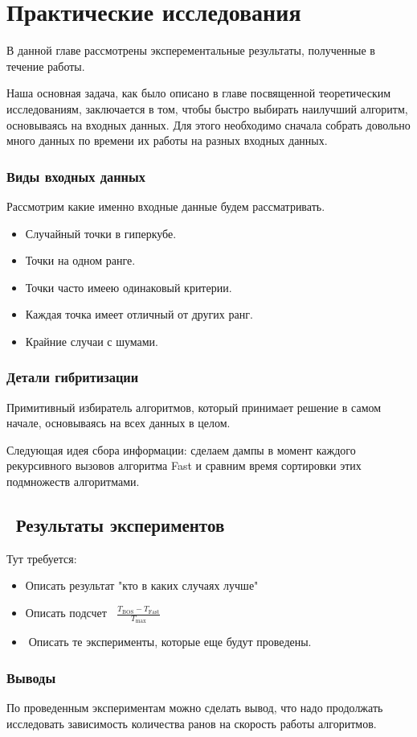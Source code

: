 \chapter{Практические исследования} 
\label{chapter3}

В данной главе рассмотрены эксперементальные результаты, полученные в течение работы.

Наша основная задача, как было описано в главе посвященной теоретическим исследованиям, заключается в том, чтобы быстро выбирать наилучший алгоритм, основываясь на входных данных.   
Для этого необходимо сначала собрать довольно много данных по времени их работы на разных входных данных. 

\subsection{Виды входных данных}
Рассмотрим какие именно входные данные будем рассматривать. 
\begin{itemize}
	\item Случайный точки в гиперкубе.
	\item Точки на одном ранге.
	\item Точки часто имеею одинаковый критерии. 
	\item Каждая точка имеет отличный от других ранг.
	\item Крайние случаи с шумами.
\end{itemize}

\subsection{Детали гибритизации}
Примитивный избиратель алгоритмов, который принимает решение в самом начале, основываясь на всех данных в целом.

Следующая идея сбора информации: сделаем дампы в момент каждого рекурсивного вызовов алгоритма Fast и сравним время сортировки этих подмножеств алгоритмами.


\section{Результаты экспериментов}



Тут требуется: 
\begin{itemize}
	\item Описать результат "кто в каких случаях лучше"
	\item Описать подсчет $\frac{T_\text{BOS} - T_\text{Fast}}{T_\text{max}}$
	\item Описать те эксперименты, которые еще будут проведены.
\end{itemize}

\subsection{Выводы}
По проведенным экспериментам можно сделать вывод, что надо продолжать исследовать зависимость количества ранов на скорость работы алгоритмов. 
